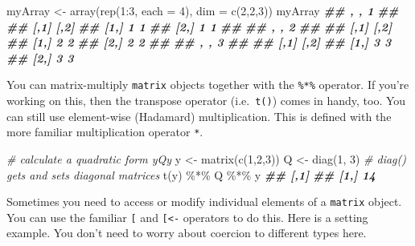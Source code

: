 \documentclass[
  12pt,
]{krantz}
\makeatletter
\newenvironment{Shaded}{\begin{snugshade}}{\end{snugshade}}
\newcommand{\AttributeTok}[1]{\textcolor[rgb]{0.61,0.61,0.61}{#1}}
\newcommand{\CommentTok}[1]{\textcolor[rgb]{0.37,0.37,0.37}{\textit{#1}}}
\newcommand{\DecValTok}[1]{\textcolor[rgb]{0.06,0.06,0.06}{#1}}
\newcommand{\DocumentationTok}[1]{\textcolor[rgb]{0.37,0.37,0.37}{\textbf{\textit{#1}}}}
\newcommand{\FunctionTok}[1]{\textcolor[rgb]{0,0,0}{#1}}
\newcommand{\NormalTok}[1]{#1}
\newcommand{\OtherTok}[1]{\textcolor[rgb]{0.37,0.37,0.37}{#1}}
\newcommand{\SpecialCharTok}[1]{\textcolor[rgb]{0,0,0}{#1}}
\newenvironment{kframe}{%
\medskip{}
\setlength{\fboxsep}{.8em}
 \def\at@end@of@kframe{}%
 \ifinner\ifhmode%
  \def\at@end@of@kframe{\end{minipage}}%
  \begin{minipage}{\columnwidth}%
 \fi\fi%
 \def\FrameCommand##1{\hskip\@totalleftmargin \hskip-\fboxsep
 \colorbox{shadecolor}{##1}\hskip-\fboxsep
     \hskip-\linewidth \hskip-\@totalleftmargin \hskip\columnwidth}%
 \MakeFramed {\advance\hsize-\width
   \@totalleftmargin\z@ \linewidth\hsize
   \@setminipage}}%
 {\par\unskip\endMakeFramed%
 \at@end@of@kframe}
\renewenvironment{Shaded}{\begin{kframe}}{\end{kframe}}
\makeatother
\begin{document}
\begin{Shaded}
\begin{Highlighting}[]
\NormalTok{myArray }\OtherTok{\textless{}{-}} \FunctionTok{array}\NormalTok{(}\FunctionTok{rep}\NormalTok{(}\DecValTok{1}\SpecialCharTok{:}\DecValTok{3}\NormalTok{, }\AttributeTok{each =} \DecValTok{4}\NormalTok{), }\AttributeTok{dim =} \FunctionTok{c}\NormalTok{(}\DecValTok{2}\NormalTok{,}\DecValTok{2}\NormalTok{,}\DecValTok{3}\NormalTok{))}
\NormalTok{myArray}
\DocumentationTok{\#\# , , 1}
\DocumentationTok{\#\# }
\DocumentationTok{\#\#      [,1] [,2]}
\DocumentationTok{\#\# [1,]    1    1}
\DocumentationTok{\#\# [2,]    1    1}
\DocumentationTok{\#\# }
\DocumentationTok{\#\# , , 2}
\DocumentationTok{\#\# }
\DocumentationTok{\#\#      [,1] [,2]}
\DocumentationTok{\#\# [1,]    2    2}
\DocumentationTok{\#\# [2,]    2    2}
\DocumentationTok{\#\# }
\DocumentationTok{\#\# , , 3}
\DocumentationTok{\#\# }
\DocumentationTok{\#\#      [,1] [,2]}
\DocumentationTok{\#\# [1,]    3    3}
\DocumentationTok{\#\# [2,]    3    3}
\end{Highlighting}
\end{Shaded}

You can matrix-multiply \texttt{matrix} objects together with the \texttt{\%*\%} operator. If you're working on this, then the transpose operator (i.e.~\texttt{t()}) comes in handy, too. You can still use element-wise (Hadamard) multiplication. This is defined with the more familiar multiplication operator \texttt{*}.

\begin{Shaded}
\begin{Highlighting}[]
\CommentTok{\# calculate a quadratic form y\textquotesingle{}Qy}
\NormalTok{y }\OtherTok{\textless{}{-}} \FunctionTok{matrix}\NormalTok{(}\FunctionTok{c}\NormalTok{(}\DecValTok{1}\NormalTok{,}\DecValTok{2}\NormalTok{,}\DecValTok{3}\NormalTok{))}
\NormalTok{Q }\OtherTok{\textless{}{-}} \FunctionTok{diag}\NormalTok{(}\DecValTok{1}\NormalTok{, }\DecValTok{3}\NormalTok{) }\CommentTok{\# diag() gets and sets diagonal matrices}
\FunctionTok{t}\NormalTok{(y) }\SpecialCharTok{\%*\%}\NormalTok{ Q }\SpecialCharTok{\%*\%}\NormalTok{ y}
\DocumentationTok{\#\#      [,1]}
\DocumentationTok{\#\# [1,]   14}
\end{Highlighting}
\end{Shaded}

Sometimes you need to access or modify individual elements of a \texttt{matrix} object. You can use the familiar \texttt{{[}} and \texttt{{[}\textless{}-} operators to do this. Here is a setting example. You don't need to worry about coercion to different types here.
\end{document}
